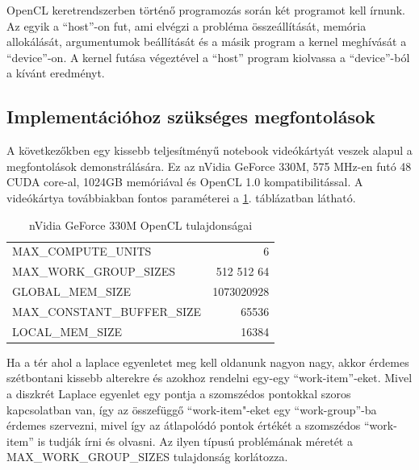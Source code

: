 	
	OpenCL keretrendszerben történő programozás során két programot kell írnunk.
	Az egyik a ``host''-on fut, ami elvégzi a probléma összeállítását, memória
	allokálását, argumentumok beállítását és a másik program a kernel meghívását a
	``device''-on.
	A kernel futása végeztével a ``host'' program kiolvassa a ``device''-ból
	a kívánt eredményt.
	
\subsection{Implementációhoz szükséges megfontolások}
	
	A következőkben egy kissebb teljesítményű notebook videókártyát veszek
	alapul a megfontolások demonstrálására. Ez az nVidia GeForce 330M, 
	575 MHz-en futó 48 CUDA core-al, 1024GB memóriával és
	OpenCL 1.0 kompatibilitással.
	A videókártya továbbiakban fontos paraméterei a \ref{table:vcard}. táblázatban
	látható.
	
	\begin{table}[!h]
	\renewcommand{\arraystretch}{1.3}
	\caption{\scriptsize nVidia GeForce 330M OpenCL tulajdonságai}
	\label{table:vcard}
	\centering
	\begin{tabular}{l|r}
		MAX\_COMPUTE\_UNITS & 6\\
		MAX\_WORK\_GROUP\_SIZES & 512 512 64\\
		GLOBAL\_MEM\_SIZE & 1073020928\\
		MAX\_CONSTANT\_BUFFER\_SIZE & 65536\\
		LOCAL\_MEM\_SIZE & 16384
	\end{tabular}
	\end{table}
	
	
	
	Ha a tér ahol a laplace egyenletet meg kell oldanunk nagyon nagy, akkor
	érdemes szétbontani kissebb alterekre és azokhoz rendelni egy-egy
	``work-item''-eket. Mivel a diszkrét Laplace egyenlet egy pontja a szomszédos
	pontokkal szoros kapcsolatban van, így az összefüggő ``work-item"-eket egy
	``work-group''-ba érdemes szervezni, mivel így az átlapolódó pontok értékét a
	szomszédos ``work-item'' is tudják írni és olvasni. Az ilyen típusú
	problémának méretét a MAX\_WORK\_GROUP\_SIZES tulajdonság korlátozza.
	
